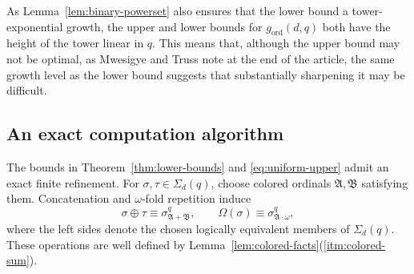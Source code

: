\documentclass{amsart}
\theoremstyle{definition}
\begin{document}
As Lemma~\ref{lem:binary-powerset} also ensures that the lower bound a tower-exponential growth, the upper and lower bounds for $g_{\mathrm{ord}}(d,q)$ both have the height of the tower linear in $q$. This means that, although the upper bound may not be optimal, as Mwesigye and Truss note at the end of the article, the same growth level as the lower bound suggests that substantially sharpening it may be difficult.

\subsection{An exact computation algorithm}

The bounds in Theorem~\ref{thm:lower-bounds} and \eqref{eq:uniform-upper} admit an exact finite refinement. For $\sigma,\tau\in\Sigma_d(q)$, choose colored ordinals $\mathfrak A,\mathfrak B$ satisfying them. Concatenation and $\omega$-fold repetition induce
$$\sigma\oplus\tau\equiv\sigma_{\mathfrak A+\mathfrak B}^q,\qquad\Omega(\sigma)\equiv\sigma_{\mathfrak A\cdot\omega}^q,
$$
where the left sides denote the chosen logically equivalent members of $\Sigma_d(q)$. These operations are well defined by Lemma~\ref{lem:colored-facts}(\ref{itm:colored-sum}).
\end{document}

